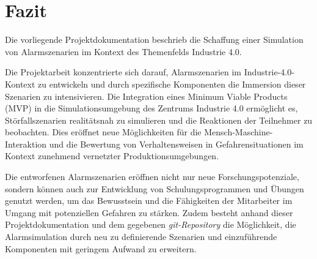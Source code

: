\section{Fazit}

Die vorliegende Projektdokumentation beschrieb die Schaffung einer Simulation von Alarmszenarien im Kontext des Themenfelds Industrie 4.0. 

Die Projektarbeit konzentrierte sich darauf, Alarmszenarien im Industrie-4.0-Kontext zu entwickeln und durch spezifische Komponenten die Immersion dieser Szenarien zu intensivieren. Die Integration eines Minimum Viable Products (MVP) in die Simulationsumgebung des Zentrums Industrie 4.0 ermöglicht es, Störfallszenarien realitätsnah zu simulieren und die Reaktionen der Teilnehmer zu beobachten. Dies eröffnet neue Möglichkeiten für die Mensch-Maschine-Interaktion und die Bewertung von Verhaltensweisen in Gefahrensituationen im Kontext zunehmend vernetzter Produktionsumgebungen.

Die entworfenen Alarmszenarien eröffnen nicht nur neue Forschungspotenziale, sondern können auch zur Entwicklung von Schulungsprogrammen und Übungen genutzt werden, um das Bewusstsein und die Fähigkeiten der Mitarbeiter im Umgang mit potenziellen Gefahren zu stärken. Zudem besteht anhand dieser Projektdokumentation und dem gegebenen \textit{git-Repository} die Möglichkeit, die Alarmsimulation durch neu zu definierende Szenarien und einzuführende Komponenten mit geringem Aufwand zu erweitern.
